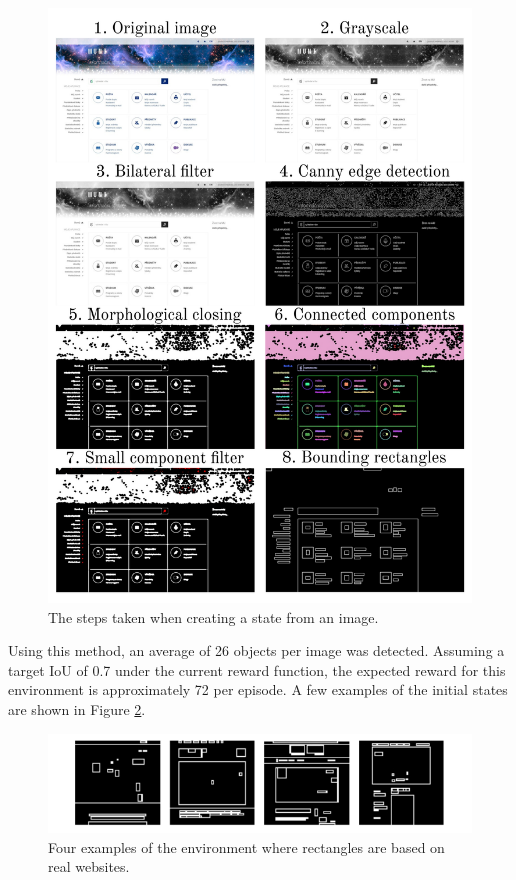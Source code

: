 \documentclass[
  digital,     %
  oneside,     %
  nosansbold,  %
  nocolorbold, %
  lof,         %
  lot,         %
]{fithesis4}
\begin{document}
\begin{figure}
    \centering
    \includegraphics[width=1\linewidth]{diagrams/simple_detector.pdf}
    \caption{The steps taken when creating a state from an image.}
    \label{fig:simple-detector}
\end{figure}

Using this method, an average of 26 objects per image was detected. Assuming a target IoU of 0.7 under the current reward function, the expected reward for this environment is approximately 72 per episode. A few examples of the initial states are shown in Figure \ref{fig:env8}.

\begin{figure}
    \centering
    \includegraphics[width=1\linewidth]{env_examples/env8.pdf}
    \caption{Four examples of the environment where rectangles are based on real websites.}
    \label{fig:env8}
\end{figure}
\end{document}
